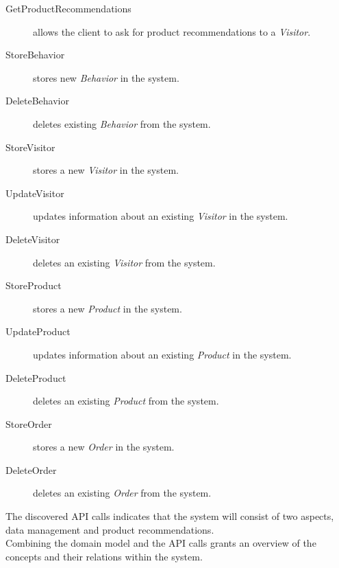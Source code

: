\begin{description}
	\item[GetProductRecommendations] allows the client to ask for product recommendations to a \textit{Visitor}.
	\item[StoreBehavior] stores new \textit{Behavior} in the system.
	\item[DeleteBehavior] deletes existing \textit{Behavior} from the system.
	\item[StoreVisitor] stores a new \textit{Visitor} in the system.
	\item[UpdateVisitor] updates information about an existing \textit{Visitor} in the system.
	\item[DeleteVisitor] deletes an existing \textit{Visitor} from the system.
	\item[StoreProduct] stores a new \textit{Product} in the system.
	\item[UpdateProduct] updates information about an existing \textit{Product} in the system.
	\item[DeleteProduct] deletes an existing \textit{Product} from the system.
	\item[StoreOrder] stores a new \textit{Order} in the system.
	\item[DeleteOrder] deletes an existing \textit{Order} from the system.
\end{description}

The discovered API calls indicates that the system will consist of two aspects, data management and product recommendations.\\
Combining the domain model and the API calls grants an overview of the concepts and their relations within the system. 